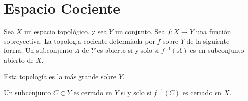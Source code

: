 \documentclass{./Topologia.tex}
\begin{document}
\chapter{Espacio Cociente}
\begin{defin}
    Sea \(X\) un espacio topológico, y sea \(Y\) un conjunto. Sea \(f:X \to Y\) una función
    sobreyectiva. La topología cociente determiada por \(f\) sobre \(Y\) de la siguiente forma.
    Un subconjunto \(A\) de \(Y\) es abierto si y solo si \(f^{-1}(A)\) es un subconjunto
    abierto de \(X\).
\end{defin}
Esta topología es la más grande sobre \(Y\).
\begin{prop}
    Un subconjunto \(C \subset Y\) es cerrado en \(Y\) si y solo si \(f^{-1}(C)\) es cerrado
    en \(X\).
\end{prop}
\end{document}

